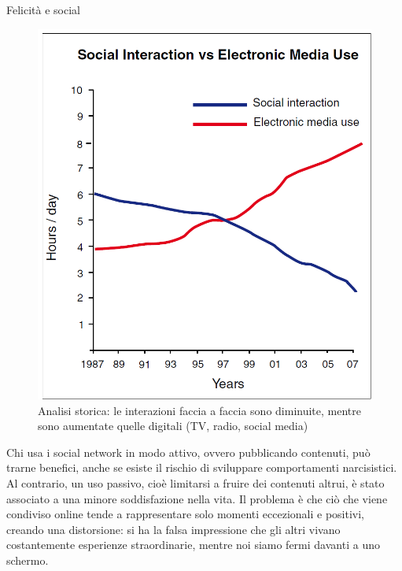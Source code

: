 \documentclass[12pt]{book} %
\begin{document}
\needspace{4cm}
\begin{mdframed}[linewidth=1pt]
Felicità e social

\begin{figure}
  \centering
  \includegraphics[width=0.95\linewidth]{images/Libro-img056.png}
  \caption{Analisi storica: le interazioni faccia a faccia sono diminuite, mentre sono aumentate quelle digitali (TV, radio, social media)\protect{}}
\end{figure}

Chi usa i social network in modo attivo, ovvero pubblicando contenuti, può trarne benefici, anche se esiste il rischio di sviluppare comportamenti narcisistici. Al contrario, un uso passivo, cioè limitarsi a fruire dei contenuti altrui, è stato associato a una minore soddisfazione nella vita. Il problema è che ciò che viene condiviso online tende a rappresentare solo momenti eccezionali e positivi, creando una distorsione: si ha la falsa impressione che gli altri vivano costantemente esperienze straordinarie, mentre noi siamo fermi davanti a uno schermo.


\end{mdframed}
\end{document}
